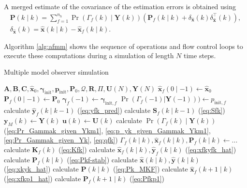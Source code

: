 A merged estimate of the covariance of the estimation errors is obtained using
\begin{equation} \label{eq:Pk_MKF}
	\begin{aligned}
	\mathbf{P}(k \mid k) = \sum_{f=1}^{n_h} \Pr(\Gamma_f(k) \mid \mathbf{Y}(k)) \left( \mathbf{P}_f(k \mid k) + \delta_\mathbf{\hat{x}}(k) \delta_\mathbf{\hat{x}}^\intercal(k) \right), \\
	\delta_\mathbf{\hat{x}}(k) = \mathbf{\hat{x}}(k \mid k) - \mathbf{\hat{x}}_f(k \mid k).
	\end{aligned}
\end{equation}

Algorithm \ref{alg:afmm} shows the sequence of operations and flow control loops to execute these computations during a simulation of length $N$ time steps.

\begin{algorithm}
	\caption{Multiple model observer simulation}  \label{alg:afmm}
	\begin{algorithmic}
			\Require $\mathbf{A}, \mathbf{B}, \mathbf{C}, \mathbf{\hat{x}}_0, \mathbf{\gamma}_{\text{init}}, \mathbf{p}_{\text{init}}, \mathbf{P}_0, \mathcal{Q}, \mathbf{R}, \Pi, \mathbf{U}(N), \mathbf{Y}(N)$
				\State $\mathbf{\hat{x}}_f(0 \mid -1) \gets \mathbf{\hat{x}}_0$
				\State $\mathbf{P}_f(0 \mid -1) \gets \mathbf{P}_0$
				\State $\mathbf{\gamma}_f(-1) \gets \mathbf{\gamma}_{\text{init},f}$
				\State $\Pr(\Gamma_f(-1)|\mathbf{Y}(-1))) \gets p_{\text{init},f}$
			\EndFor
				\State calculate $\mathbf{\hat{y}}_f(k \mid k-1)$ (\ref{eq:yfk_pred}) 
				\State calculate $\mathbf{S}_f(k \mid k-1)$ (\ref{eq:Sfk})
			\EndFor
			\State $\mathbf{y}_M(k) \gets \mathbf{Y}(k)$   %
			\State $\mathbf{u}(k) \gets \mathbf{U}(k)$
				\State calculate $\Pr(\Gamma_f(k) \mid \mathbf{Y}(k))$ (\ref{eq:Pr_Gammak_given_Ykm1}, \ref{eq:p_yk_given_Gammak_Ykm1}, \ref{eq:Pr_Gammak_given_Yk}, \ref{eq:qfk})       %
			\EndFor
			\State $\Gamma_f(k \mid k), \mathbf{\hat{x}}_f(k \mid k), \mathbf{P}_f(k \mid k) \gets ...$   %
				\State calculate $\mathbf{K}_f(k)$ (\ref{eq:Kfk}) 
				\State calculate $\mathbf{\hat{x}}_f(k \mid k), \mathbf{\hat{y}}_f(k \mid k)$ (\ref{eq:xfkyfk_hat})
				\State calculate $\mathbf{P}_f(k \mid k)$ (\ref{eq:Pkf-stab})
			\EndFor
			\State calculate $\mathbf{\hat{x}}(k \mid k), \mathbf{\hat{y}}(k \mid k)$ (\ref{eq:xkyk_hat}) 
			\State calculate $\mathbf{P}(k \mid k)$ (\ref{eq:Pk_MKF})   %
				\State calculate $\mathbf{\hat{x}}_f(k+1 \mid k)$ (\ref{eq:xfkp1_hat}) 
				\State calculate $\mathbf{P}_f(k+1 \mid k)$ (\ref{eq:Pfkp1})
			\EndFor
			\EndFor
		\end{algorithmic}
\end{algorithm}

